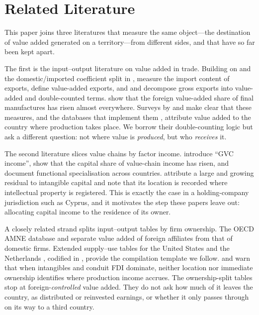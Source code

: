 \section{Related Literature}
\label{sec:literature}

This paper joins three literatures that measure the same object---the destination of value added generated on a territory---from different sides, and that have so far been kept apart.

The first is the input--output literature on value added in trade.
Building on \citet{Leontief1936} and the domestic/imported coefficient split in \citet{MillerBlair2009}, \citet{HummelsIshiiYi2001} measure the import content of exports, \citet{JohnsonNoguera2012} define value-added exports, and \citet{KoopmanWangWei2014} and \citet{LosTimmerdeVries2016} decompose gross exports into value-added and double-counted terms.
\citet{LosTimmerdeVries2015} show that the foreign value-added share of final manufactures has risen almost everywhere.
Surveys by \citet{Johnson2018} and \citet{AntrasChor2022} make clear that these measures, and the databases that implement them \citep{Timmeretal2015,Yamanoetal2021,Eurostat2019FIGARO,Ahmadetal2017}, attribute value added to the country where production takes place.
We borrow their double-counting logic but ask a different question: not where value is \emph{produced}, but who \emph{receives} it.

The second literature slices value chains by factor income.
\citet{Timmeretal2013} introduce ``GVC income'', \citet{Timmeretal2014} show that the capital share of value-chain income has risen, and \citet{TimmerMiroudotdeVries2019} document functional specialisation across countries.
\citet{ChenLosTimmer2018} attribute a large and growing residual to intangible capital and note that its location is recorded where intellectual property is registered.
This is exactly the case in a holding-company jurisdiction such as Cyprus, and it motivates the step these papers leave out: allocating capital income to the residence of its owner.

A closely related strand splits input--output tables by firm ownership.
The OECD AMNE database \citep{Cadestinetal2018} and \citet{MiroudotYe2020} separate value added of foreign affiliates from that of domestic firms.
Extended supply--use tables for the United States \citep{Fetzeretal2018} and the Netherlands \citep{Chongetal2019}, codified in \citet{UN2023GVC}, provide the compilation template we follow.
\citet{Lipsey2010} and \citet{CasellaBorgaWacker2023} warn that when intangibles and conduit FDI dominate, neither location nor immediate ownership identifies where production income accrues.
The ownership-split tables stop at foreign-\emph{controlled} value added.
They do not ask how much of it leaves the country, as distributed or reinvested earnings, or whether it only passes through on its way to a third country.


